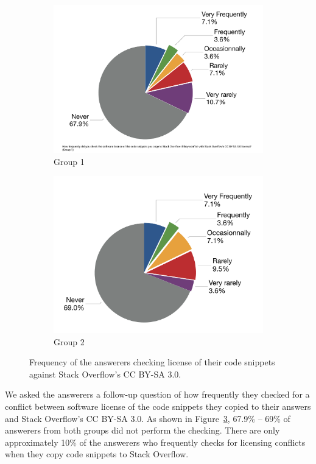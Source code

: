 \documentclass{svjour3}                     %
\begin{document}
\begin{figure}
	\begin{subfigure}{.5\textwidth}
		\centering
		\includegraphics[width=.75\linewidth]{survey_license_check_1}
		\caption{Group 1}
		\label{fig:survey_license_check_1}
	\end{subfigure}%
	\begin{subfigure}{.5\textwidth}
		\centering
		\includegraphics[width=.75\linewidth]{survey_license_check_2}
		\caption{Group 2}
		\label{fig:survey_license_check_2}
	\end{subfigure}
	\caption{Frequency of the answerers checking license of their code snippets against Stack Overflow's CC BY-SA 3.0.}
	\label{fig:survey_license_check}
\end{figure}

We asked the answerers a follow-up question of how frequently they checked for a conflict between software license of the code snippets they copied to their answers and Stack Overflow's CC BY-SA 3.0. As shown in Figure~\ref{fig:survey_license_check}, 67.9\% -- 69\% of answerers from both groups did not perform the checking. There are only approximately 10\% of the answerers who frequently checks for licensing conflicts when they copy code snippets to Stack Overflow.
\end{document}
